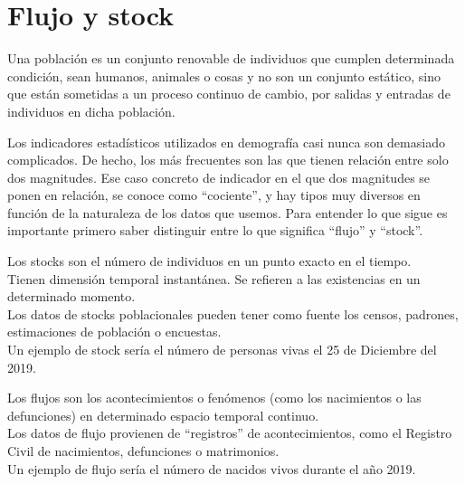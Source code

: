 \section{Flujo y stock}
\begin{Def}
    Una población es un conjunto renovable de individuos que cumplen determinada condición, sean humanos, animales o cosas y no son un conjunto estático, sino que están sometidas a un proceso continuo de cambio, por salidas y entradas de individuos en dicha población.
\end{Def}
Los indicadores estadísticos utilizados en demografía casi nunca son demasiado complicados. De hecho, los más frecuentes son las que tienen relación entre solo dos magnitudes. Ese caso concreto de indicador en el que dos magnitudes se ponen en relación, se conoce como “cociente”, y hay tipos muy diversos en función de la naturaleza de los datos que usemos. Para entender lo que sigue es importante primero saber distinguir entre lo que significa “flujo” y “stock”.
\begin{Def}
    Los stocks son el número de individuos en un punto exacto en el tiempo.\\
    Tienen dimensión temporal instantánea. Se refieren a las existencias en un determinado momento.\\
    Los datos de stocks poblacionales pueden tener como fuente los censos, padrones, estimaciones de población o encuestas.\\
    Un ejemplo de stock sería el número de personas vivas el 25 de Diciembre del 2019.
\end{Def}
\begin{Def}
    Los flujos son los acontecimientos o fenómenos (como los nacimientos o las defunciones) en determinado espacio temporal continuo.\\Los datos de flujo provienen de “registros” de acontecimientos, como el Registro Civil de nacimientos, defunciones o matrimonios.\\
    Un ejemplo de flujo sería el número de nacidos vivos durante el año 2019.
\end{Def}